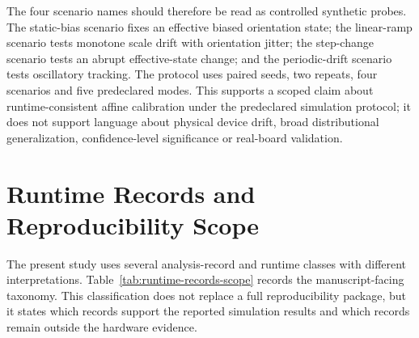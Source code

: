 \documentclass[11pt]{article}
\begin{document}
The four scenario names should therefore be read as controlled synthetic
probes.  The static-bias scenario fixes an effective biased orientation
state; the linear-ramp scenario tests monotone scale drift with orientation
jitter; the step-change scenario tests an abrupt effective-state change; and
the periodic-drift scenario tests oscillatory tracking.  The protocol uses
paired seeds, two repeats, four scenarios and five predeclared modes.  This
supports a scoped claim about runtime-consistent affine calibration under the
predeclared simulation protocol; it does not support language about physical
device drift, broad distributional generalization, confidence-level
significance or real-board validation.

\section{Runtime Records and Reproducibility Scope}

The present study uses several analysis-record and runtime classes with
different interpretations.  Table~\ref{tab:runtime-records-scope} records the
manuscript-facing taxonomy.  This classification does not replace a full
reproducibility package, but it states which records support the reported
simulation results and which records remain outside the hardware evidence.
\end{document}
